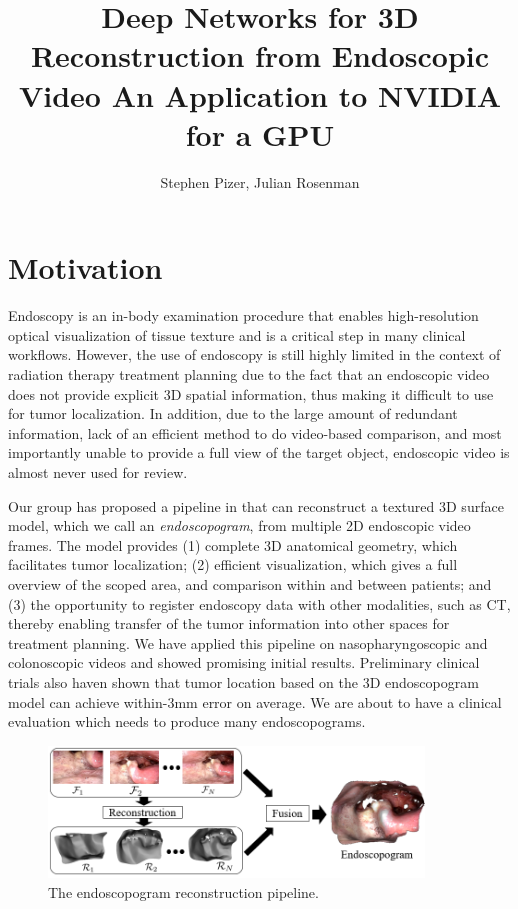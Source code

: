 \documentclass{llncs}
\begin{document}
\title{Deep Networks for 3D Reconstruction from Endoscopic Video An Application to NVIDIA for a GPU}

\author{Stephen Pizer, Julian Rosenman}
\maketitle

\section{Motivation}
Endoscopy is an in-body examination procedure that enables high-resolution optical visualization of tissue texture and is a critical step in many clinical workflows. However, the use of endoscopy is still highly limited in the context of radiation therapy treatment planning due to the fact that an endoscopic video does not provide explicit 3D spatial information, thus making it difficult to use for tumor localization. In addition, due to the large amount of redundant information, lack of an efficient method to do video-based comparison, and most importantly unable to provide a full view of the target object, endoscopic video is almost never used for review.

Our group has proposed a pipeline in \cite{zhao16} that can reconstruct a textured 3D surface model, which we call an \textit{endoscopogram}, from multiple 2D endoscopic video frames. The model provides (1) complete 3D anatomical geometry, which facilitates tumor localization; (2) efficient visualization, which gives a full overview of the scoped area, and comparison within and between patients; and (3) the opportunity to register endoscopy data with other modalities, such as CT, thereby enabling transfer of the tumor information into other spaces for treatment planning. We have applied this pipeline on nasopharyngoscopic and colonoscopic videos \cite{zhao16,rui16} and showed promising initial results. Preliminary clinical trials also haven shown that tumor location based on the 3D endoscopogram model can achieve within-3mm error on average. We are about to have a clinical evaluation which needs to produce many endoscopograms.

\begin{figure}[!b]
  \centering
  \includegraphics[height=3.5cm]{figures/pipeline}
  \caption{The endoscopogram reconstruction pipeline.}
\end{figure}
\end{document}
